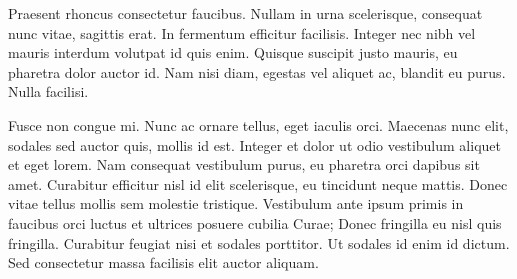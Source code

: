 \documentclass{article}
\begin{document}
Praesent rhoncus consectetur faucibus. Nullam in urna scelerisque, consequat nunc vitae, sagittis erat. In fermentum efficitur facilisis. Integer nec nibh vel mauris interdum volutpat id quis enim. Quisque suscipit justo mauris, eu pharetra dolor auctor id. Nam nisi diam, egestas vel aliquet ac, blandit eu purus. Nulla facilisi.

Fusce non congue mi. Nunc ac ornare tellus, eget iaculis orci. Maecenas nunc elit, sodales sed auctor quis, mollis id est. Integer et dolor ut odio vestibulum aliquet et eget lorem. Nam consequat vestibulum purus, eu pharetra orci dapibus sit amet. Curabitur efficitur nisl id elit scelerisque, eu tincidunt neque mattis. Donec vitae tellus mollis sem molestie tristique. Vestibulum ante ipsum primis in faucibus orci luctus et ultrices posuere cubilia Curae; Donec fringilla eu nisl quis fringilla. Curabitur feugiat nisi et sodales porttitor. Ut sodales id enim id dictum. Sed consectetur massa facilisis elit auctor aliquam.
\end{document}
